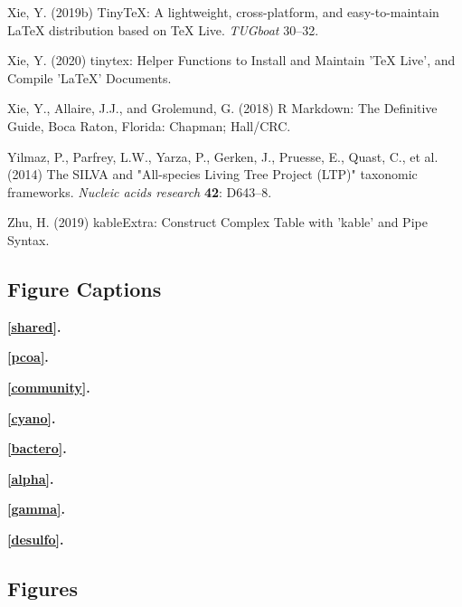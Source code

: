 \documentclass[12pt,]{article}
\begin{document}
\leavevmode\hypertarget{ref-Xie2019}{}%
Xie, Y. (2019b) TinyTeX: A lightweight, cross-platform, and
easy-to-maintain LaTeX distribution based on TeX Live. \emph{TUGboat}
30--32.

\leavevmode\hypertarget{ref-Xie2020}{}%
Xie, Y. (2020) tinytex: Helper Functions to Install and Maintain 'TeX
Live', and Compile 'LaTeX' Documents.

\leavevmode\hypertarget{ref-Xie2018}{}%
Xie, Y., Allaire, J.J., and Grolemund, G. (2018) R Markdown: The
Definitive Guide, Boca Raton, Florida: Chapman; Hall/CRC.

\leavevmode\hypertarget{ref-Yilmaz2014}{}%
Yilmaz, P., Parfrey, L.W., Yarza, P., Gerken, J., Pruesse, E., Quast,
C., et al. (2014) The SILVA and "All-species Living Tree Project (LTP)"
taxonomic frameworks. \emph{Nucleic acids research} \textbf{42}:
D643--8.

\leavevmode\hypertarget{ref-Zhu2019}{}%
Zhu, H. (2019) kableExtra: Construct Complex Table with 'kable' and Pipe
Syntax.

\newpage 
\setlength\parindent{0pt}

\hypertarget{figure-captions}{%
\subsection{Figure Captions}\label{figure-captions}}

\textbf{\autoref{shared}.} 

\textbf{\autoref{pcoa}.} 

\textbf{\autoref{community}.} 

\textbf{\autoref{cyano}.} 

\textbf{\autoref{bactero}.} 

\textbf{\autoref{alpha}.} 

\textbf{\autoref{gamma}.} 

\textbf{\autoref{desulfo}.} 

\hypertarget{figures}{%
\subsection{Figures}\label{figures}}
\end{document}
